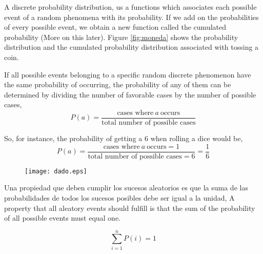 \begin{paracol}{2}
A discrete probability distribution, us a functions which associates each possible event of a random phenomena with its probability. If we add on the probabilities of every possible event, we obtain a new function called the cumulated probability (More on this later). Figure \ref{fig:moneda} shows the probability distribution and the cumulated probability distribution associated with tossing a coin.

If all possible events belonging to a specific random discrete phenomenon have the same probability of occurring, the probability of any of them can be determined by dividing the number of favorable cases by the number of possible cases,
\begin{equation*}
	P(a)=\frac{\text{cases where} \ a \ \text{occurs}}{\text{total number of possible cases}}
\end{equation*}

So, for instance, the probability of getting a $6$ when rolling a dice would be,
\begin{equation*}
	P(a)=\frac{\text{cases where} \ a \ \text{occurs} = 1}{\text{total number of possible cases}=6}=\frac{1}{6}
\end{equation*}
\end{paracol}
\begin{figure}
\centering
\texttt{[image: dado.eps]}
\label{fig:dado}
\end{figure}

\begin{paracol}{2}
Una propiedad que deben cumplir los sucesos aleatorios es que la suma de las probabilidades de todos los sucesos posibles debe ser igual a la unidad,
\switchcolumn
A property that all aleatory events should fulfill is that the sum of the probability of all possible events must equal one. 
\end{paracol}
\begin{equation*}
\sum_{i=1}^n P(i) = 1
\end{equation*}


